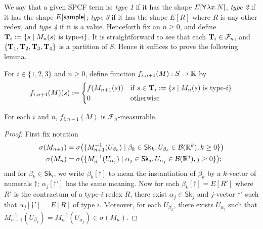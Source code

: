 We say that a given SPCF term is: %
\emph{type 1} if it has the shape $E[\mathsf{Y} \lambda x. N]$, \emph{type 2} if it has the shape $E[\mathsf{sample}]$; \emph{type 3} if it has the shape $E[R]$ where $R$ is any other redex, and \emph{type 4} if it is a value.
Henceforth fix an $n \geq 0$, and define $\mathbf{T}_i := \{s \mid M_n(s) \hbox{ is type-$i$}\}$.
It is straightforward to see that each $\mathbf{T}_i \in \mathcal{F}_n$, and $\{\mathbf{T}_1, \mathbf{T}_2, \mathbf{T}_3, \mathbf{T}_4\}$ is a partition of $S$.
Hence it suffices to prove the following lemma.

\iffalse
For $i \in \{1, 2, 3\}$ and $n \geq 0$, define function $f_{i, n+1}(M) : S \to \mathbb{R}$ by
\[
f_{i, n+1}(M)(s) :=
\begin{cases}
f(M_{n+1}(s)) & \hbox{if }s \in \mathbf{T}_i := 
\{s \mid M_n(s) \textrm{ is type-$i$}\}\\
0 & \textrm{otherwise}
\end{cases}
\]
\begin{lemma}
\label{lem:inde}
For each $i$ and $n$, $f_{i, n+1}(M)$ is %
$\mathcal{F}_{n}$-measurable.
\end{lemma}

\begin{proof} First fix notation
\begin{align*}
\sigma(M_{n+1}) &= \sigma\big(\{M_{n+1}^{-1}(U_{\beta_k})
\mid \beta_k\in \mathsf{Sk}_k, U_{\beta_k} \in \mathcal{B}(\mathbb{R}^k), k \geq 0\}\big)\\
\sigma(M_{n}) &= \sigma\big(\{M_{n}^{-1}(U_{\alpha_j})
\mid \alpha_j\in \mathsf{Sk}_j, U_{\alpha_j} \in \mathcal{B}(\mathbb{R}^j), j \geq 0\}\big);
\end{align*}
and for $\beta_k \in \mathsf{Sk}_i$, we write $\beta_k[\dagger]$ to mean the instantiation of $\beta_k$ by a $k$-vector of numerals $\dagger$; $\alpha_j[\dagger']$ has the same meaning.
Now for each $\beta_k[\dagger] = E[R']$ where $R'$ is the contractum of a type-$i$ redex $R$, there exist $\alpha_j \in \mathsf{Sk}_j$ and $j$-vector $\dagger'$ such that $\alpha_j[\dagger'] = E[R]$ of type $i$.
Moreover, for each $U_{\beta_k}$, there exists $U_{\alpha_j}$ such that $M_{n+1}^{-1}(U_{\beta_k}) = M_{n}^{-1}(U_{\alpha_j}) \in \sigma(M_n)$.
\end{proof}

